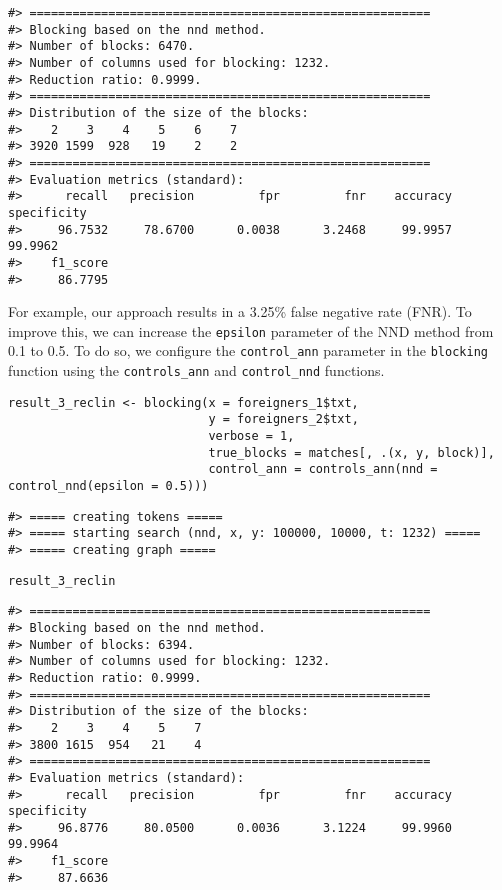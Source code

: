 \begin{verbatim}
#> ========================================================
#> Blocking based on the nnd method.
#> Number of blocks: 6470.
#> Number of columns used for blocking: 1232.
#> Reduction ratio: 0.9999.
#> ========================================================
#> Distribution of the size of the blocks:
#>    2    3    4    5    6    7 
#> 3920 1599  928   19    2    2 
#> ========================================================
#> Evaluation metrics (standard):
#>      recall   precision         fpr         fnr    accuracy specificity 
#>     96.7532     78.6700      0.0038      3.2468     99.9957     99.9962 
#>    f1_score 
#>     86.7795
\end{verbatim}

For example, our approach results in a
3.25\% false negative
rate (FNR). To improve this, we can increase the \texttt{epsilon} parameter of
the NND method from 0.1 to 0.5. To do so, we configure the \texttt{control\_ann}
parameter in the \texttt{blocking} function using the \texttt{controls\_ann} and
\texttt{control\_nnd} functions.

\begin{verbatim}
result_3_reclin <- blocking(x = foreigners_1$txt,
                            y = foreigners_2$txt,
                            verbose = 1,
                            true_blocks = matches[, .(x, y, block)],
                            control_ann = controls_ann(nnd = control_nnd(epsilon = 0.5)))
\end{verbatim}

\begin{verbatim}
#> ===== creating tokens =====
#> ===== starting search (nnd, x, y: 100000, 10000, t: 1232) =====
#> ===== creating graph =====
\end{verbatim}

\begin{verbatim}
result_3_reclin
\end{verbatim}

\begin{verbatim}
#> ========================================================
#> Blocking based on the nnd method.
#> Number of blocks: 6394.
#> Number of columns used for blocking: 1232.
#> Reduction ratio: 0.9999.
#> ========================================================
#> Distribution of the size of the blocks:
#>    2    3    4    5    7 
#> 3800 1615  954   21    4 
#> ========================================================
#> Evaluation metrics (standard):
#>      recall   precision         fpr         fnr    accuracy specificity 
#>     96.8776     80.0500      0.0036      3.1224     99.9960     99.9964 
#>    f1_score 
#>     87.6636
\end{verbatim}

